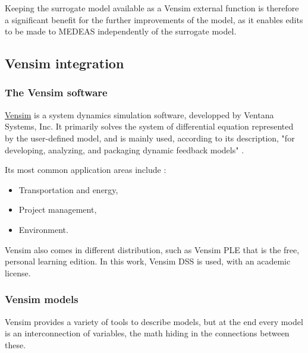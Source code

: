 Keeping the surrogate model available as a Vensim external function is therefore a significant benefit for the further improvements of the model, as it enables edits to be made to MEDEAS independently of the surrogate model.

\subsection{Vensim integration}

\subsubsection{The Vensim software}

\href{https://vensim.com/}{Vensim} is a system dynamics simulation software, developped by Ventana Systems, Inc. It primarily solves the system of differential equation represented by the user-defined model, and is mainly used, according to its description, "for developing, analyzing, and packaging dynamic feedback models" \cite{vensim-website}.

Its most common application areas include \cite{wiki-vensim}:
\begin{itemize}
    \item Transportation and energy,
    \item Project management,
    \item Environment.
\end{itemize}

Vensim also comes in different distribution, such as Vensim PLE that is the free, personal learning edition. In this work, Vensim DSS is used, with an academic license.


\subsubsection{Vensim models}

Vensim provides a variety of tools to describe models, but at the end every model is an interconnection of variables, the math hiding in the connections between these. 


